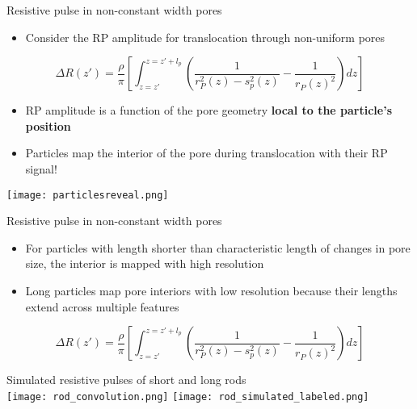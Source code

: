 
\begin{frame}[c]{Resistive pulse in non-constant width pores}
	\begin{itemize}
		\item Consider the RP amplitude for translocation through non-uniform pores
	\end{itemize}
	$$ \Delta R\left(z'\right)=\frac{\rho}{\pi}\left[\int_{z=z'}^{z=z'+l_{p}}\left(\frac{1}{r_{P}^{2}\left(z\right)-s_{p}^{2}\left(z\right)}-\frac{1}{r_{P}\left(z\right)^{2}}\right)dz\right] $$
	\begin{itemize}
		\item RP amplitude is a function of the pore geometry \textbf{local to the particle's position}
		\item Particles map the interior of the pore during translocation with their RP signal!
	\end{itemize}
	
	{\centering
		\texttt{[image: particlesreveal.png]} \\
		\par
	}

	
\end{frame}



\begin{frame}[c]{Resistive pulse in non-constant width pores}
	\begin{itemize}
		\item For particles with length shorter than characteristic length of changes in pore size, the interior is mapped with high resolution
		\item Long particles map pore interiors with low resolution because their lengths extend across multiple features
	\end{itemize}
	\vspace{.1in}
	$$ \Delta R\left(z'\right)=\frac{\rho}{\pi}\left[\int_{z=z'}^{z=z'+l_{p}}\left(\frac{1}{r_{P}^{2}\left(z\right)-s_{p}^{2}\left(z\right)}-\frac{1}{r_{P}\left(z\right)^{2}}\right)dz\right] $$
	\vspace{.1in}
	{\centering
		Simulated resistive pulses of short and long rods \\
		\vspace{.1in}
		\texttt{[image: rod\_convolution.png]}
		\hspace{.4in}
		\texttt{[image: rod\_simulated\_labeled.png]}
		\par
	}
	
\end{frame}

